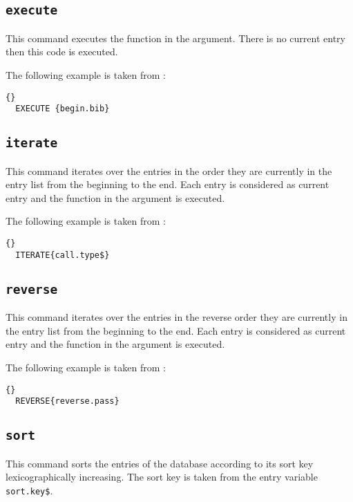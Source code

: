 \subsection{\texttt{execute}}

This command executes the function in the argument. There is no
current entry then this code is executed.

The following example is taken from :

\begin{lstlisting}{}
  EXECUTE {begin.bib}
\end{lstlisting}


\subsection{\texttt{iterate}}

This command iterates over the entries in the order they are currently
in the entry list from the beginning to the end. Each entry is
considered as current entry and the function in the argument is
executed.

The following example is taken from :

\begin{lstlisting}{}
  ITERATE{call.type$}
\end{lstlisting}


\subsection{\texttt{reverse}}

This command iterates over the entries in the reverse order they are
currently in the entry list from the beginning to the end. Each entry
is considered as current entry and the function in the argument is
executed.

The following example is taken from :

\begin{lstlisting}{}
  REVERSE{reverse.pass}
\end{lstlisting}


\subsection{\texttt{sort}}

This command sorts the entries of the database according to its sort
key lexicographically increasing. The sort key is taken from the entry
variable \texttt{sort.key\$}.


